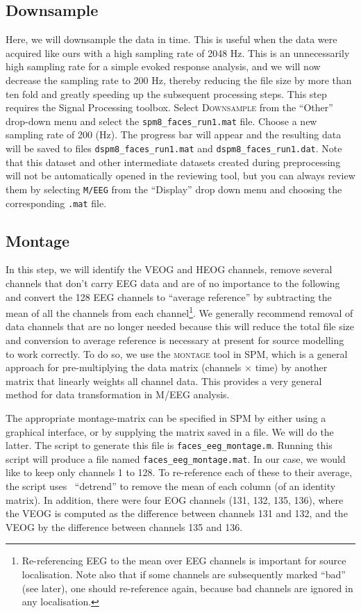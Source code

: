 \subsection{Downsample}

Here, we will downsample the data in time. This is useful when the data were acquired like ours with a high sampling rate of 2048 Hz. This is an unnecessarily high sampling rate for a simple evoked response analysis, and we will now decrease the sampling rate to 200 Hz, thereby reducing the file size by more than ten fold and greatly speeding up the subsequent processing steps. This step requires the Signal Processing toolbox. Select \textsc{Downsample} from the ``Other'' drop-down menu and select the \texttt{spm8\_faces\_run1.mat} file. Choose a new sampling rate of 200 (Hz). The progress bar will appear and the resulting data will be saved to files \texttt{dspm8\_faces\_run1.mat} and \texttt{dspm8\_faces\_run1.dat}. Note that this dataset and other intermediate datasets created during preprocessing will not be automatically opened in the reviewing tool, but you can always review them by selecting \texttt{M/EEG} from the ``Display'' drop down menu and choosing the corresponding \texttt{.mat} file.

\subsection{Montage}

In this step, we will identify the VEOG and HEOG channels, remove several channels that don't carry EEG data and are of no importance to the following and convert the 128 EEG channels to ``average reference'' by subtracting the mean of all the channels from each channel\footnote{Re-referencing EEG to the mean over EEG channels is important for source localisation. Note also that if some channels are subsequently marked ``bad'' (see later), one should re-reference again, because bad channels are ignored in any localisation.}. We generally recommend removal of data channels that are no longer needed because this will reduce the total file size and conversion to average reference is necessary at present for source modelling to work correctly. To do so, we use the \textsc{montage} tool in SPM, which is a general approach for pre-multiplying the data matrix (channels $\times$ time) by another matrix that linearly weights all channel data. This provides a very general method for data transformation in M/EEG analysis.

The appropriate montage-matrix can be specified in SPM by either using a graphical interface, or by supplying the matrix saved in a file. We will do the latter. The script to generate this file is \texttt{faces\_eeg\_montage.m}. Running this script will produce a file named \texttt{faces\_eeg\_montage.mat}. In our case, we would like to keep only channels 1 to 128. To re-reference each of these to their average, the script uses \matlab\ ``detrend'' to remove the mean of each column (of an identity matrix). In addition, there were four EOG channels (131, 132, 135, 136), where the VEOG is computed as the difference between channels 131 and 132, and the VEOG by the difference between channels 135 and 136. 

